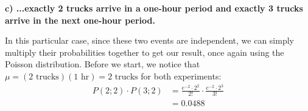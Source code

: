 \documentclass[12pt, letter]{article}
\begin{document}
\qquad \textbf{c) ...exactly 2 trucks arrive in a one-hour period and exactly 3 trucks arrive in the next one-hour period.}
\begin{center}
	In this particular case, since these two events are independent, we can simply multiply their probabilities together to get our result, once again using the Poisson distribution. Before we start, we notice that $\mu = (\text{2 trucks})(\text{1 hr}) = \text{2 trucks}$ for both experiments:
	\begin{align*}
		P(2;2) \cdot P(3;2) &= \frac{e^{-2} \cdot 2^{2}}{2!} \cdot \frac{e^{-2} \cdot 2^{3}}{3!} \\
		&= \boxed{0.0488}
	\end{align*}
\end{center}
\end{document}
